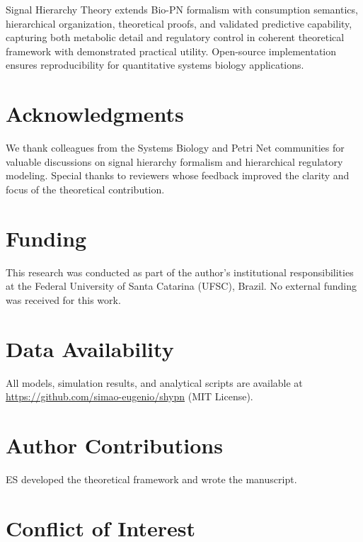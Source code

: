 \documentclass[twocolumn,11pt]{article}
\begin{document}
\vspace{3pt}
\noindent Signal Hierarchy Theory extends Bio-PN formalism with consumption semantics, hierarchical organization, theoretical proofs, and validated predictive capability, capturing both metabolic detail and regulatory control in coherent theoretical framework with demonstrated practical utility. Open-source implementation ensures reproducibility for quantitative systems biology applications.


\section*{Acknowledgments}

\vspace{3pt}
\noindent We thank colleagues from the Systems Biology and Petri Net communities for valuable discussions on signal hierarchy formalism and hierarchical regulatory modeling. Special thanks to reviewers whose feedback improved the clarity and focus of the theoretical contribution.

\section*{Funding}

\vspace{3pt}
\noindent This research was conducted as part of the author's institutional responsibilities at the Federal University of Santa Catarina (UFSC), Brazil. No external funding was received for this work.

\section*{Data Availability}

\vspace{3pt}
\noindent All models, simulation results, and analytical scripts are available at \url{https://github.com/simao-eugenio/shypn} (MIT License).

\section*{Author Contributions}

\vspace{3pt}
\noindent ES developed the theoretical framework and wrote the manuscript.

\section*{Conflict of Interest}
\end{document}
